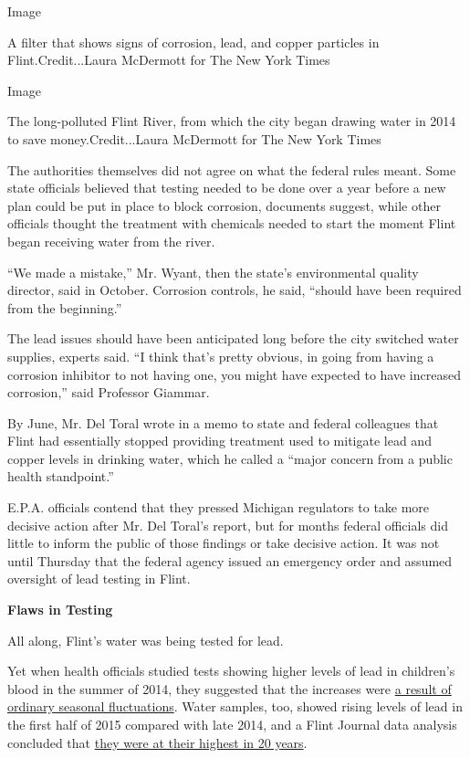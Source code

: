 Image

A filter that shows signs of corrosion, lead, and copper particles in
Flint.Credit...Laura McDermott for The New York Times

Image

The long-polluted Flint River, from which the city began drawing water
in 2014 to save money.Credit...Laura McDermott for The New York Times

The authorities themselves did not agree on what the federal rules
meant. Some state officials believed that testing needed to be done over
a year before a new plan could be put in place to block corrosion,
documents suggest, while other officials thought the treatment with
chemicals needed to start the moment Flint began receiving water from
the river.

``We made a mistake,'' Mr. Wyant, then the state's environmental quality
director, said in October. Corrosion controls, he said, ``should have
been required from the beginning.''

The lead issues should have been anticipated long before the city
switched water supplies, experts said. ``I think that's pretty obvious,
in going from having a corrosion inhibitor to not having one, you might
have expected to have increased corrosion,'' said Professor Giammar.

By June, Mr. Del Toral wrote in a memo to state and federal colleagues
that Flint had essentially stopped providing treatment used to mitigate
lead and copper levels in drinking water, which he called a ``major
concern from a public health standpoint.''

E.P.A. officials contend that they pressed Michigan regulators to take
more decisive action after Mr. Del Toral's report, but for months
federal officials did little to inform the public of those findings or
take decisive action. It was not until Thursday that the federal agency
issued an emergency order and assumed oversight of lead testing in
Flint.

\textbf{Flaws in Testing}

All along, Flint's water was being tested for lead.

Yet when health officials studied tests showing higher levels of lead in
children's blood in the summer of 2014, they suggested that the
increases were
\href{http://www.mlive.com/news/flint/index.ssf/2015/09/state_says_its_data_shows_no_c.html}{a
result of ordinary seasonal fluctuations}. Water samples, too, showed
rising levels of lead in the first half of 2015 compared with late 2014,
and a Flint Journal data analysis concluded that
\href{http://www.mlive.com/news/flint/index.ssf/2015/09/flint_water_lead_levels_spiked.html}{they
were at their highest in 20 years}.

